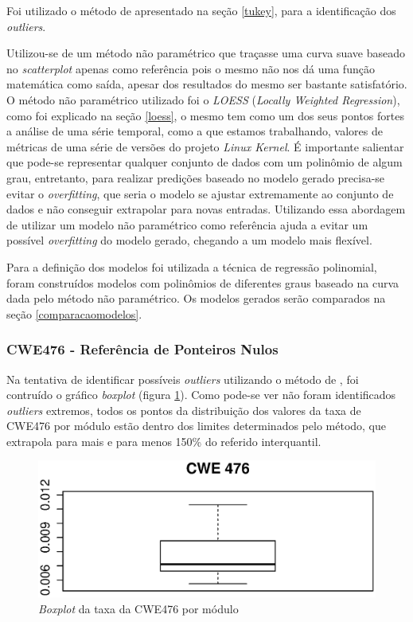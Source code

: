 Foi utilizado o método de  apresentado na seção \ref{tukey},
para a identificação dos \textit{outliers}. 

Utilizou-se de um método não paramétrico que traçasse uma curva suave baseado no
\textit{scatterplot} apenas como referência pois o mesmo não nos dá uma função
matemática como saída, apesar dos resultados do mesmo ser bastante satisfatório.
O método não paramétrico utilizado foi o \textit{LOESS} (\textit{Locally Weighted
Regression}), como foi explicado na seção \ref{loess}, o mesmo tem como um dos
seus pontos fortes a análise de uma série temporal, como a que estamos
trabalhando, valores de métricas de uma série de versões do projeto \textit{Linux
Kernel}. É importante salientar que pode-se representar qualquer conjunto de
dados com um polinômio de algum grau, entretanto, para realizar predições
baseado no modelo gerado precisa-se evitar o \textit{overfitting}, que seria o
modelo se ajustar extremamente ao conjunto de dados e não conseguir extrapolar
para novas entradas. Utilizando essa abordagem de utilizar um modelo não
paramétrico como referência ajuda a evitar um possível \textit{overfitting} do
modelo gerado, chegando a um modelo mais flexível.

Para a definição dos modelos foi utilizada a técnica de regressão polinomial,
foram construídos modelos com polinômios de diferentes graus baseado na curva
dada pelo método não paramétrico. Os modelos gerados serão comparados na seção
\ref{comparacaomodelos}.

\subsubsection{CWE476 - Referência de Ponteiros Nulos}

Na tentativa de identificar possíveis \textit{outliers} utilizando o método de
, foi contruído o gráfico \textit{boxplot} (figura
\ref{fig:cwe476-boxplot}). Como pode-se ver não foram identificados
\textit{outliers} extremos, todos os pontos da distribuição dos valores da taxa
de CWE476 por módulo estão dentro dos limites determinados pelo método, que
extrapola para mais e para menos 150\% do referido interquantil.

\begin{figure}[h]
  \centering
  \includegraphics[width=1.0\textwidth]
      {figuras/cwe476-boxplot.eps}
      \caption{\textit{Boxplot} da taxa da CWE476 por módulo}
  \label{fig:cwe476-boxplot}
\end{figure}

